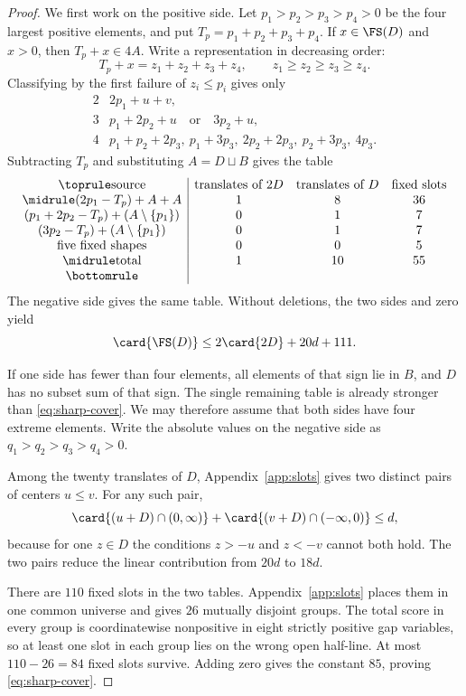 \begin{proof}
We first work on the positive side.  Let
$p_1>p_2>p_3>p_4>0$ be the four largest positive elements, and put
$T_p=p_1+p_2+p_3+p_4$.  If $x\in\FS(D)$ and $x>0$, then
$T_p+x\in4A$.  Write a representation in decreasing order:
\[
 T_p+x=z_1+z_2+z_3+z_4,
 \qquad z_1\geq z_2\geq z_3\geq z_4.
\]
Classifying by the first failure of $z_i\leq p_i$ gives only
\[
\begin{array}{c|l}
2&2p_1+u+v,\\
3&p_1+2p_2+u\quad\text{or}\quad3p_2+u,\\
4&p_1+p_2+2p_3,\ p_1+3p_3,\ 2p_2+2p_3,\ p_2+3p_3,\ 4p_3.
\end{array}
\]
Subtracting $T_p$ and substituting $A=D\sqcup B$ gives the table
\[
\begin{array}{c|ccc}
\toprule
\text{source}&\text{translates of }2D&\text{translates of }D&\text{fixed slots}\\
\midrule
(2p_1-T_p)+A+A&1&8&36\\
(p_1+2p_2-T_p)+(A\setminus\{p_1\})&0&1&7\\
(3p_2-T_p)+(A\setminus\{p_1\})&0&1&7\\
\text{five fixed shapes}&0&0&5\\
\midrule
\text{total}&1&10&55\\
\bottomrule
\end{array}
\]
The negative side gives the same table.  Without deletions, the two sides and
zero yield
\begin{equation}
 \card{\FS(D)}\leq2\card{2D}+20d+111.
 \label{eq:raw-cover}
\end{equation}

If one side has fewer than four elements, all elements of that sign lie in
$B$, and $D$ has no subset sum of that sign.  The single remaining table is
already stronger than \eqref{eq:sharp-cover}.  We may therefore assume that
both sides have four extreme elements.  Write the absolute values on the
negative side as $q_1>q_2>q_3>q_4>0$.

Among the twenty translates of $D$, Appendix~\ref{app:slots} gives two
distinct pairs of centers $u\leq v$.  For any such pair,
\begin{equation}
 \card{(u+D)\cap(0,\infty)}+
 \card{(v+D)\cap(-\infty,0)}\leq d,
 \label{eq:halfline}
\end{equation}
because for one $z\in D$ the conditions $z>-u$ and $z<-v$ cannot both hold.
The two pairs reduce the linear contribution from $20d$ to $18d$.

There are $110$ fixed slots in the two tables.  Appendix~\ref{app:slots}
places them in one common universe and gives $26$ mutually disjoint groups.
The total score in every group is coordinatewise nonpositive in eight
strictly positive gap variables, so at least one slot in each group lies on
the wrong open half-line.  At most $110-26=84$ fixed slots survive.  Adding
zero gives the constant $85$, proving \eqref{eq:sharp-cover}.
\end{proof}


